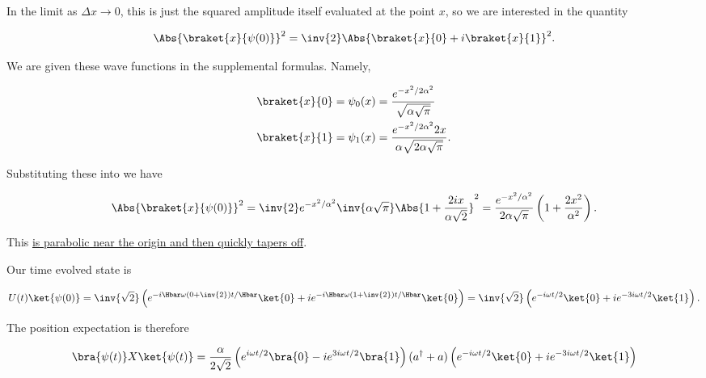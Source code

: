 {In the limit as \(\Delta x \rightarrow 0\), this is just the squared amplitude itself evaluated at the point \(x\), so we are interested in the quantity 

\begin{equation}\label{eqn:qmIexamPractice2008Dec:3:210}
\Abs{ \braket{x}{\psi(0)} }^2  = \inv{2} \Abs{ \braket{x}{0} + i \braket{x}{1} }^2.
\end{equation}

We are given these wave functions in the supplemental formulas.  Namely,

\begin{equation}\label{eqn:qmIexamPractice2008Dec:3:220}
\begin{aligned}
\braket{x}{0} &= \psi_0(x) = \frac{e^{-x^2/2\alpha^2}}{ \sqrt{\alpha \sqrt{\pi}}} \\
\braket{x}{1} &= \psi_1(x) = \frac{e^{-x^2/2\alpha^2} 2 x }{ \alpha \sqrt{2 \alpha \sqrt{\pi}}}.
\end{aligned}
\end{equation}

Substituting these into  we have

\begin{equation}\label{eqn:qmIexamPractice2008Dec:3:230}
\Abs{ \braket{x}{\psi(0)} }^2 
= 
\inv{2} 
e^{-x^2/\alpha^2}
\inv{ 
\alpha \sqrt{\pi}}
\Abs{ 1 + \frac{2 i x}{\alpha \sqrt{2} } }^2
=
\frac{e^{-x^2/\alpha^2}}{ 2
\alpha \sqrt{\pi}}
\left( 1 + \frac{2 x^2}{\alpha^2 } \right).
\end{equation}

This \href{http://www.wolframalpha.com/input/?i=graph+e^(-x^2)+(1+\%2B+2x^2)}{is parabolic near the origin and then quickly tapers off}.


Our time evolved state is

\begin{equation}\label{eqn:qmIexamPractice2008Dec:3:300}
U(t) \ket{\psi(0)} = \inv{\sqrt{2}}
\left(
e^{-i \Hbar \omega \left( 0 + \inv{2} \right) t/\Hbar } \ket{0}
+ i e^{-i \Hbar \omega \left( 1 + \inv{2} \right) t/\Hbar } \ket{0}
\right)
=
\inv{\sqrt{2}}
\left(
e^{-i \omega t/2 } \ket{0}
+ i e^{- 3 i \omega t/2 } \ket{1}
\right).
\end{equation}

The position expectation is therefore

\begin{equation}\label{eqn:qmIexamPractice:750}
\begin{aligned}
\bra{\psi(t)} X \ket{\psi(t)}
&= 
\frac{\alpha}{2 \sqrt{2}}
\left(
e^{i \omega t/2 } \bra{0}
- i e^{ 3 i \omega t/2 } \bra{1}
\right)
(a^\dagger + a)
\left(
e^{-i \omega t/2 } \ket{0}
+ i e^{- 3 i \omega t/2 } \ket{1}
\right) \\
\end{aligned}
\end{equation}

}
